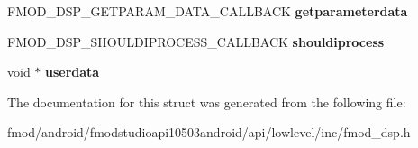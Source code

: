 \begin{DoxyCompactItemize}
\item 
\hypertarget{struct_f_m_o_d___d_s_p___d_e_s_c_r_i_p_t_i_o_n_acb5d5c179097cbfbb3e59797056e74b9}{F\+M\+O\+D\+\_\+\+D\+S\+P\+\_\+\+G\+E\+T\+P\+A\+R\+A\+M\+\_\+\+D\+A\+T\+A\+\_\+\+C\+A\+L\+L\+B\+A\+C\+K {\bfseries getparameterdata}}\label{struct_f_m_o_d___d_s_p___d_e_s_c_r_i_p_t_i_o_n_acb5d5c179097cbfbb3e59797056e74b9}

\item 
\hypertarget{struct_f_m_o_d___d_s_p___d_e_s_c_r_i_p_t_i_o_n_a177d7f2e7714abcc0c31533801e61116}{F\+M\+O\+D\+\_\+\+D\+S\+P\+\_\+\+S\+H\+O\+U\+L\+D\+I\+P\+R\+O\+C\+E\+S\+S\+\_\+\+C\+A\+L\+L\+B\+A\+C\+K {\bfseries shouldiprocess}}\label{struct_f_m_o_d___d_s_p___d_e_s_c_r_i_p_t_i_o_n_a177d7f2e7714abcc0c31533801e61116}

\item 
\hypertarget{struct_f_m_o_d___d_s_p___d_e_s_c_r_i_p_t_i_o_n_abb6785cf56e08cfb75a036095ebbb1ef}{void $\ast$ {\bfseries userdata}}\label{struct_f_m_o_d___d_s_p___d_e_s_c_r_i_p_t_i_o_n_abb6785cf56e08cfb75a036095ebbb1ef}

\end{DoxyCompactItemize}


The documentation for this struct was generated from the following file\+:\begin{DoxyCompactItemize}
\item 
fmod/android/fmodstudioapi10503android/api/lowlevel/inc/fmod\+\_\+dsp.\+h\end{DoxyCompactItemize}
